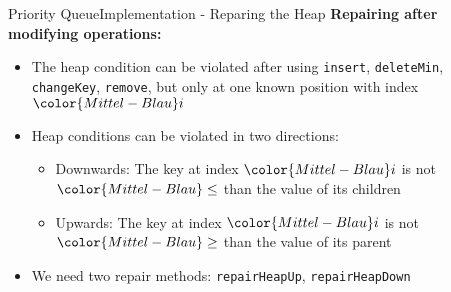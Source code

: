 \begin{frame}{Priority Queue}{Implementation - Reparing the Heap}
  \textbf{Repairing after modifying operations:}
  \begin{itemize}
    \item<2->
      The heap condition can be violated after using
      {\color{Mittel-Blau}\texttt{insert}},
      {\color{Mittel-Blau}\texttt{deleteMin}},
      {\color{Mittel-Blau}\texttt{changeKey}},
      {\color{Mittel-Blau}\texttt{remove}},
      but only at one known position with index ${\color{Mittel-Blau}i}$
    \item<3->
      Heap conditions can be violated in two directions:
      \begin{itemize}
        \item<4->
          Downwards:
          The key at index ${\color{Mittel-Blau}i}$ is not
          ${\color{Mittel-Blau}\leq}$ than the value of its children
        \item<5->
          Upwards:
          The key at index ${\color{Mittel-Blau}i}$ is not
          ${\color{Mittel-Blau}\geq}$ than the value of its parent
      \end{itemize}
    \item<6->
      We need two repair methods:
      {\color{Mittel-Blau}\texttt{repairHeapUp}},
      {\color{Mittel-Blau}\texttt{repairHeapDown}}
  \end{itemize}
\end{frame}


